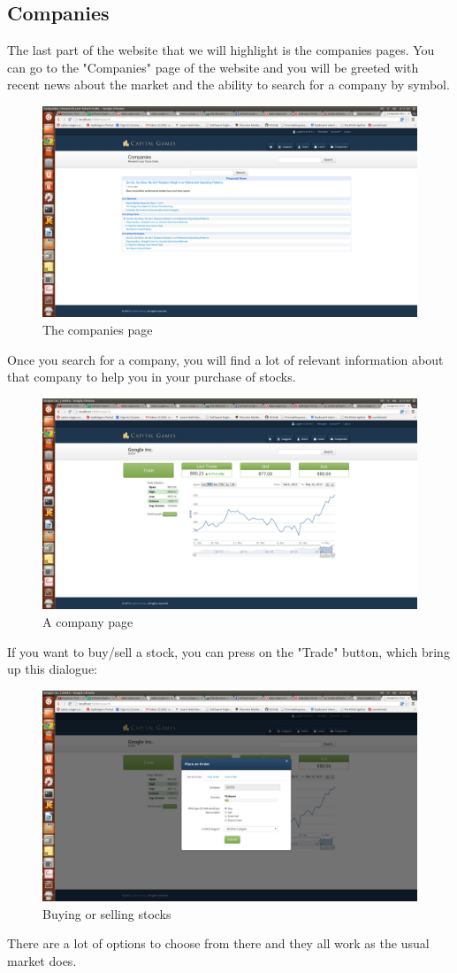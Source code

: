 \subsection{Companies}
The last part of the website that we will highlight is the companies pages. You can go to the "Companies" page of the website and you will be greeted with recent news about the market and the ability to search for a company by symbol. 
\begin{figure}[H]
\centering
\includegraphics[width=5.5in]{./img/finalDesign/companies.png}
\caption{The companies page}
\end{figure}
Once you search for a company, you will find a lot of relevant information about that company to help you in your purchase of stocks. 
\begin{figure}[H]
\centering
\includegraphics[width=5.5in]{./img/finalDesign/company.png}
\caption{A company page}
\end{figure}
If you want to buy/sell a stock, you can press on the "Trade" button, which bring up this dialogue:
\begin{figure}[H]
\centering
\includegraphics[width=5.5in]{./img/finalDesign/buy.png}
\caption{Buying or selling stocks}
\end{figure}
There are a lot of options to choose from there and they all work as the usual market does.
